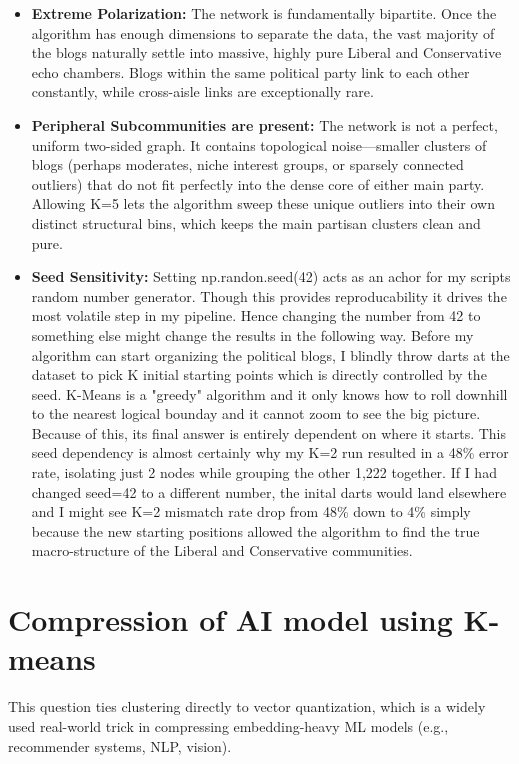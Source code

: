 \documentclass[twoside, 10pt]{article}
\begin{document}
\begin{itemize}
    \item \textbf{Extreme Polarization:} The network is fundamentally bipartite. Once the algorithm has enough dimensions to separate the data, the vast majority of the blogs naturally settle into massive, highly pure Liberal and Conservative echo chambers. Blogs within the same political party link to each other constantly, while cross-aisle links are exceptionally rare.
    \item \textbf{Peripheral Subcommunities are present:} The network is not a perfect, uniform two-sided graph. It contains topological noise—smaller clusters of blogs (perhaps moderates, niche interest groups, or sparsely connected outliers) that do not fit perfectly into the dense core of either main party. Allowing K=5 lets the algorithm sweep these unique outliers into their own distinct structural bins, which keeps the main partisan clusters clean and pure.
    \item \textbf{Seed Sensitivity:} Setting np.randon.seed(42) acts as an achor for my scripts random number generator. Though this provides reproducability it drives the most volatile step in my pipeline. Hence changing the number from 42 to something else might change the results in the following way. Before my algorithm can start organizing the political blogs, I blindly throw darts at the dataset to pick K initial starting points which is directly controlled by the seed. K-Means is a "greedy" algorithm and it only knows how to roll downhill to the nearest logical bounday and it cannot zoom to see the big picture. Because of this, its final answer is entirely dependent on where it starts. This seed dependency is almost certainly why my K=2 run resulted in a 48\% error rate, isolating just 2 nodes while grouping the other 1,222 together. If I had changed seed=42 to a different number, the inital darts would land elsewhere and I might see K=2 mismatch rate drop from 48\% down to 4\% simply because the new starting positions allowed the algorithm to find the true macro-structure of the Liberal and Conservative communities.
\end{itemize}

\section{Compression of AI model using K-means}
This question ties clustering directly to vector quantization, which is a widely used real-world trick in compressing embedding-heavy ML models (e.g., recommender systems, NLP, vision).
\end{document}
